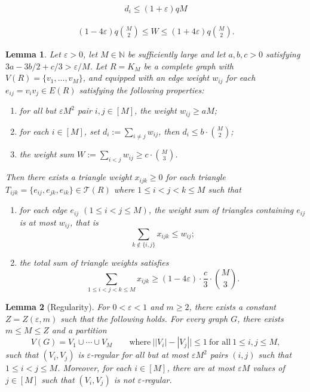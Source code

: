 \documentclass[10pt,a4paper]{amsart}
\newtheorem{lemma}{Lemma}
\newcommand\dT{\mathcal{T}}
\renewcommand\ge{\geqslant}
\renewcommand\geq{\geqslant}
\renewcommand\le{\leqslant}
\renewcommand\leq{\leqslant}
\begin{document}
\begin{align}\label{eq:di}
d_i\leq (1+\varepsilon)qM
\end{align}

\begin{align}\label{eq:W}
(1-4\varepsilon)q\binom{M}{2}\le W\le
(1+4\varepsilon)q\binom{M}{2}.   
\end{align}

\begin{lemma}\label{lem:reducedweight}
Let $\varepsilon>0$, let $M\in\mathbb{N}$ be sufficiently large and let $a,b,c>0$ satisfying $3a-3b/2+c/3>\varepsilon/M$. Let $R=K_M$ be a complete graph with $V(R)=\{v_1,...,v_M\}$, and equipped with an edge weight $w_{ij}$ for each $e_{ij}=v_iv_j\in E(R)$ satisfying the following properties:
\begin{enumerate}
    \item[$(W_1)$] for all but $\varepsilon M^2$ pair $i,j\in[M]$, the weight $w_{ij}\geq aM$;

    \item[$(W_2)$] for each $i\in[M]$, set $d_i:=\sum_{i\neq j}w_{ij}$, then $d_i\leq b\cdot\binom{M}{2}$;

    \item[$(W_3)$] the weight sum $ W:=\sum_{i<j} w_{ij}\geq c\cdot \binom{M}{3}$.
\end{enumerate}
Then there exists a triangle weight $x_{ijk}\geq 0$ for each triangle $T_{ijk}=\{e_{ij},e_{jk},e_{ik}\}\in\dT(R)$ where $1\leq i<j<k\leq M$ such that 
\begin{enumerate}
    \item [$(X_1)$] for each edge $e_{ij}$ $(1\leq i<j\leq M)$, the weight sum of triangles containing $e_{ij}$ is at most $w_{ij}$, that is
    $$\sum_{k\notin\{i,j\}}x_{ijk}\leq w_{ij};$$

    \item [$(X_2)$] the total sum of triangle weights satisfies
    $$\sum_{1\leq i<j<k\leq M}x_{ijk}\geq (1-4\varepsilon)\cdot \frac{c}{3}\cdot\binom{M}{3}.$$
\end{enumerate}
\end{lemma}

\begin{lemma}[Regularity]\label{lem:regularity}
For $0<\varepsilon<1$ and $m\ge 2$, there exists a constant $Z=Z(\varepsilon,m)$ such that the following holds. For every graph $G$, there exists $m\le M\le Z$ and a partition
$$V(G)=V_1\cup \cdots \cup V_{M} \qquad\text{where}\ \big||V_i|-|V_j|\big|\leq 1\ \text{for all}\ 1\leq i,j\leq M,$$
such that $(V_i,V_j)$ is $\varepsilon$-regular for all but at most $\varepsilon M^2$ pairs $(i,j)$ such that $1\le i<j\le M$. Moreover, for each $i\in [M]$, there are at most $\varepsilon M$ values of $j\in [M]$ such that $(V_i,V_j)$ is not $\varepsilon$-regular.
\end{lemma}
\end{document}
